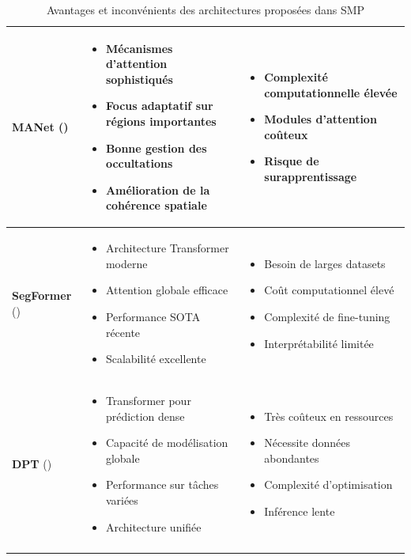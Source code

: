 \begin{longtable}{|p{2.2cm}|p{6cm}|p{6cm}|}
\textbf{MANet} (\citeyear{fan_ma-net_2020}) \cite{fan_ma-net_2020} & 
\begin{itemize}[leftmargin=0.4cm]
    \item Mécanismes d'attention sophistiqués
    \item Focus adaptatif sur régions importantes
    \item Bonne gestion des occultations
    \item Amélioration de la cohérence spatiale
\end{itemize} & 
\begin{itemize}[leftmargin=0.4cm]
    \item Complexité computationnelle élevée
    \item Modules d'attention coûteux
    \item Risque de surapprentissage
\end{itemize} \\
\hline

\textbf{SegFormer} (\citeyear{xie_segformer_2021}) \cite{xie_segformer_2021} & 
\begin{itemize}[leftmargin=0.4cm]
    \item Architecture Transformer moderne
    \item Attention globale efficace
    \item Performance SOTA récente
    \item Scalabilité excellente
\end{itemize} & 
\begin{itemize}[leftmargin=0.4cm]
    \item Besoin de larges datasets
    \item Coût computationnel élevé
    \item Complexité de fine-tuning
    \item Interprétabilité limitée
\end{itemize} \\
\hline

\textbf{DPT} (\citeyear{ranftl_vision_2021}) \cite{ranftl_vision_2021} & 
\begin{itemize}[leftmargin=0.4cm]
    \item Transformer pour prédiction dense
    \item Capacité de modélisation globale
    \item Performance sur tâches variées
    \item Architecture unifiée
\end{itemize} & 
\begin{itemize}[leftmargin=0.4cm]
    \item Très coûteux en ressources
    \item Nécessite données abondantes
    \item Complexité d'optimisation
    \item Inférence lente
\end{itemize} \\
\hline

\caption{Avantages et inconvénients des architectures proposées dans SMP}
\label{tab:ch36_architecture_smp_avantage_inconvenient}
\end{longtable}

